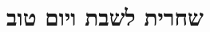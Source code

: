 \documentclass[twoside, openany, parskip=half, 11pt]{book}
\begin{document}
%
%
%
%
%
%
%
%

\chapter[שחרית לשבת ויו״ט]{ שחרית לשבת ויום טוב }
\end{document}
